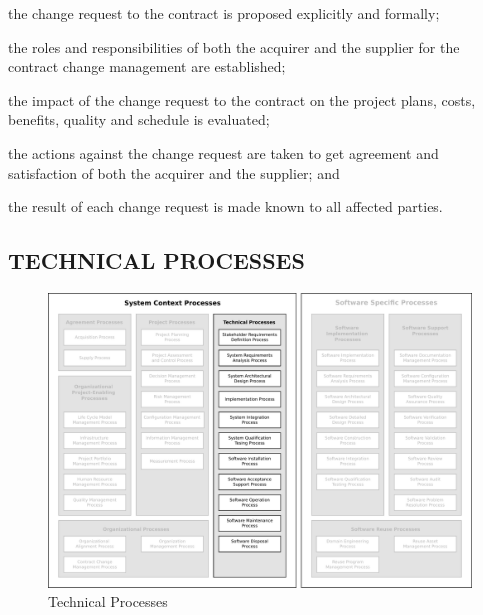 			\begin{adjustwidth}{2em}{0pt} 

				\begin{compactitem}

					\item the change request to the contract is proposed explicitly and formally;

					\item the roles and responsibilities of both the acquirer and the supplier for the contract change management are established;

					\item the impact of the change request to the contract on the project plans, costs, benefits, quality and schedule is evaluated;

					\item the actions against the change request are taken to get agreement and satisfaction of both the acquirer and the supplier; and

					\item the result of each change request is made known to all affected parties.

				\end{compactitem}

			\end{adjustwidth}


	\newpage 
	\subsection{TECHNICAL PROCESSES\label{subsec:technical_processes}}

		\begin{figure}[h]
			\centering
			\includegraphics[width=15cm,keepaspectratio]{figures/life-cycle-process-groups-technical-processes.pdf}
			\caption{Technical Processes}
			\label{fig:technical_processes}
		\end{figure}


